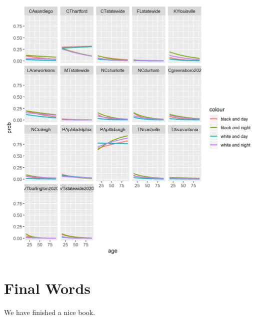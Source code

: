 \documentclass[
]{book}
\begin{document}
\includegraphics{cities_night_day_log_reg.jpg}

\hypertarget{final-words}{%
\chapter{Final Words}\label{final-words}}

We have finished a nice book.

  
\end{document}
